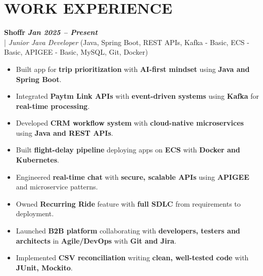\documentclass[10pt,a4paper]{article}
\begin{document}
\section*{WORK EXPERIENCE}
\small

\noindent
  \textbf{Shoffr} \hfill \textit{\textbf{Jan 2025 -- Present}} \\
  \;|\;
  \textit{Junior Java Developer} (Java, Spring Boot, REST APIs, Kafka - Basic, ECS - Basic, APIGEE - Basic, MySQL, Git, Docker)
\begin{itemize}



\item Built app for \textbf{trip prioritization} with \textbf{AI-first mindset} using \textbf{Java and Spring Boot}.



\item Integrated \textbf{Paytm Link APIs} with \textbf{event-driven systems} using \textbf{Kafka} for \textbf{real-time processing}.



\item Developed \textbf{CRM workflow system} with \textbf{cloud-native microservices} using \textbf{Java and REST APIs}.



\item Built \textbf{flight-delay pipeline} deploying apps on \textbf{ECS} with \textbf{Docker and Kubernetes}.



\item Engineered \textbf{real-time chat} with \textbf{secure, scalable APIs} using \textbf{APIGEE} and microservice patterns.



\item Owned \textbf{Recurring Ride} feature with \textbf{full SDLC} from requirements to deployment.



\item Launched \textbf{B2B platform} collaborating with \textbf{developers, testers and architects} in \textbf{Agile/DevOps} with \textbf{Git and Jira}.



\item Implemented \textbf{CSV reconciliation} writing \textbf{clean, well-tested code} with \textbf{JUnit, Mockito}.



\end{itemize}
\end{document}
